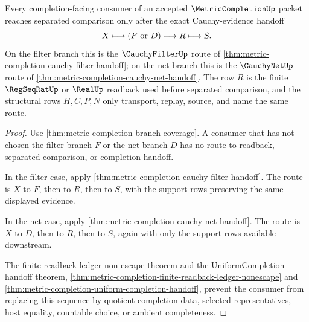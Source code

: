 \begin{theorem}
\label{thm:metric-completion-cauchy-evidence-handoff}
Every completion-facing consumer of an accepted $\MetricCompletionUp$ packet reaches separated comparison only after the exact Cauchy-evidence handoff
$$
X \longmapsto (F\ \hbox{or}\ D) \longmapsto R \longmapsto S .
$$
On the filter branch this is the $\CauchyFilterUp$ route of \autoref{thm:metric-completion-cauchy-filter-handoff}; on the net branch this is the $\CauchyNetUp$ route of \autoref{thm:metric-completion-cauchy-net-handoff}. The row $R$ is the finite $\RegSeqRatUp$ or $\RealUp$ readback used before separated comparison, and the structural rows $H,C,P,N$ only transport, replay, source, and name the same route.
\end{theorem}
\begin{proof}
Use \autoref{thm:metric-completion-branch-coverage}. A consumer that has not chosen the filter branch $F$ or the net branch $D$ has no route to readback, separated comparison, or completion handoff.

In the filter case, apply \autoref{thm:metric-completion-cauchy-filter-handoff}. The route is $X$ to $F$, then to $R$, then to $S$, with the support rows preserving the same displayed evidence.

In the net case, apply \autoref{thm:metric-completion-cauchy-net-handoff}. The route is $X$ to $D$, then to $R$, then to $S$, again with only the support rows available downstream.

The finite-readback ledger non-escape theorem and the UniformCompletion handoff theorem, \autoref{thm:metric-completion-finite-readback-ledger-nonescape} and \autoref{thm:metric-completion-uniform-completion-handoff}, prevent the consumer from replacing this sequence by quotient completion data, selected representatives, host equality, countable choice, or ambient completeness.
\end{proof}


